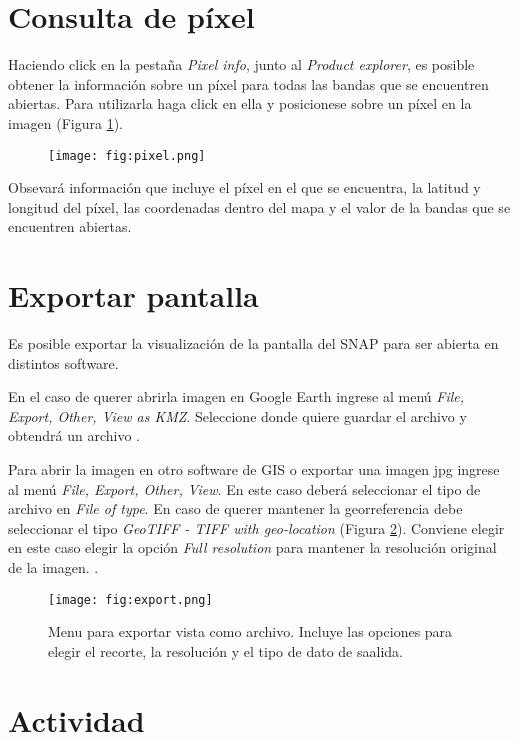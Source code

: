 \section{Consulta de píxel}

Haciendo click en la pestaña \emph{Pixel info}, junto al \emph{Product explorer}, es posible obtener la información sobre un píxel para todas las bandas que se encuentren abiertas. Para utilizarla haga click en ella y posicionese sobre un píxel en la imagen (Figura \ref{fig:pixel}).

\begin{figure}[h!]
    \centering
    \texttt{[image: fig:pixel.png]}
    \caption{}
    \label{fig:pixel}
\end{figure}

Obsevará información que incluye el píxel en el que se encuentra, la latitud y longitud del píxel, las coordenadas dentro del mapa y el valor de la bandas que se encuentren abiertas.

\section{Exportar pantalla}

Es posible exportar la visualización de la pantalla del SNAP para ser abierta en distintos software.

En el caso de querer abrirla imagen en Google Earth ingrese al menú \emph{File, Export, Other, View as KMZ}. Seleccione donde quiere guardar el archivo y obtendrá un archivo .

Para abrir la imagen en otro software de GIS o exportar una imagen jpg ingrese al menú \emph{File, Export, Other, View}. En este caso deberá seleccionar el tipo de archivo en \emph{File of type}. En caso de querer mantener la georreferencia debe seleccionar el tipo \emph{GeoTIFF - TIFF with geo-location} (Figura \ref{fig:export}). Conviene elegir en este caso elegir la opción \emph{Full resolution} para mantener la resolución original de la imagen.
.

\begin{figure}[h!]
    \centering
    \texttt{[image: fig:export.png]}
    \caption{Menu para exportar vista como archivo. Incluye las opciones para elegir el recorte, la resolución y el tipo de dato de saalida.}
    \label{fig:export}
\end{figure}

\section{Actividad}

